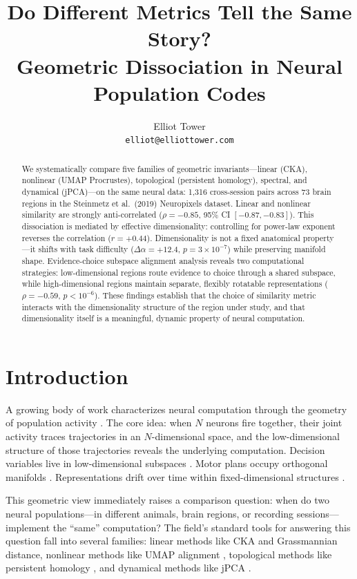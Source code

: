 \documentclass{article}
\title{Do Different Metrics Tell the Same Story? \\
Geometric Dissociation in Neural Population Codes}
\author{
Elliot Tower \\
\texttt{elliot@elliottower.com}
}
\begin{document}
\maketitle

\begin{abstract}
We systematically compare five families of geometric invariants---linear (CKA), nonlinear (UMAP Procrustes), topological (persistent homology), spectral, and dynamical (jPCA)---on the same neural data: 1,316 cross-session pairs across 73 brain regions in the Steinmetz et al.\ (2019) Neuropixels dataset. Linear and nonlinear similarity are strongly anti-correlated ($\rho = -0.85$, 95\% CI $[-0.87, -0.83]$). This dissociation is mediated by effective dimensionality: controlling for power-law exponent reverses the correlation ($r = +0.44$). Dimensionality is not a fixed anatomical property---it shifts with task difficulty ($\Delta\alpha = +12.4$, $p = 3 \times 10^{-7}$) while preserving manifold shape. Evidence-choice subspace alignment analysis reveals two computational strategies: low-dimensional regions route evidence to choice through a shared subspace, while high-dimensional regions maintain separate, flexibly rotatable representations ($\rho = -0.59$, $p < 10^{-6}$). These findings establish that the choice of similarity metric interacts with the dimensionality structure of the region under study, and that dimensionality itself is a meaningful, dynamic property of neural computation.
\end{abstract}

\section{Introduction}

A growing body of work characterizes neural computation through the geometry of population activity \citep{cunningham2014dimensionality, gallego2017neural}. The core idea: when $N$ neurons fire together, their joint activity traces trajectories in an $N$-dimensional space, and the low-dimensional structure of those trajectories reveals the underlying computation. Decision variables live in low-dimensional subspaces \citep{steinmetz2019distributed}. Motor plans occupy orthogonal manifolds \citep{gallego2017neural}. Representations drift over time within fixed-dimensional structures \citep{driscoll2022representational}.

This geometric view immediately raises a comparison question: when do two neural populations—in different animals, brain regions, or recording sessions—implement the ``same'' computation? The field's standard tools for answering this question fall into several families: linear methods like CKA \citep{kornblith2019similarity} and Grassmannian distance, nonlinear methods like UMAP alignment \citep{mcinnes2018umap}, topological methods like persistent homology \citep{rybakken2019decoding}, and dynamical methods like jPCA \citep{churchland2012neural}.
\end{document}
